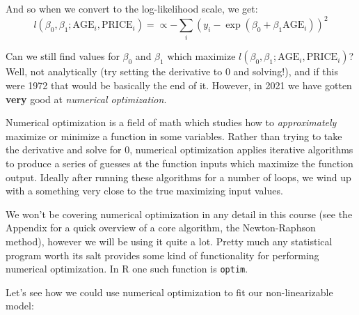 \documentclass[
]{article}
\newenvironment{Shaded}{\begin{snugshade}}{\end{snugshade}}
\newcommand{\AttributeTok}[1]{\textcolor[rgb]{0.77,0.63,0.00}{#1}}
\newcommand{\CommentTok}[1]{\textcolor[rgb]{0.56,0.35,0.01}{\textit{#1}}}
\newcommand{\ControlFlowTok}[1]{\textcolor[rgb]{0.13,0.29,0.53}{\textbf{#1}}}
\newcommand{\DecValTok}[1]{\textcolor[rgb]{0.00,0.00,0.81}{#1}}
\newcommand{\FunctionTok}[1]{\textcolor[rgb]{0.00,0.00,0.00}{#1}}
\newcommand{\NormalTok}[1]{#1}
\newcommand{\OtherTok}[1]{\textcolor[rgb]{0.56,0.35,0.01}{#1}}
\newcommand{\SpecialCharTok}[1]{\textcolor[rgb]{0.00,0.00,0.00}{#1}}
\begin{document}
And so when we convert to the log-likelihood scale, we get: \[
l(\beta_0, \beta_1; \text{AGE}_i, \text{PRICE}_i) = \propto -\sum_i (y_i - \exp{\left(\beta_0 + \beta_1 \text{AGE}_i\right)})^2
\]

Can we still find values for \(\beta_0\) and \(\beta_1\) which maximize
\(l(\beta_0, \beta_1; \text{AGE}_i, \text{PRICE}_i)\)? Well, not
analytically (try setting the derivative to 0 and solving!), and if this
were 1972 that would be basically the end of it. However, in 2021 we
have gotten \textbf{very} good at \emph{numerical optimization}.

Numerical optimization is a field of math which studies how to
\emph{approximately} maximize or minimize a function in some variables.
Rather than trying to take the derivative and solve for 0, numerical
optimization applies iterative algorithms to produce a series of guesses
at the function inputs which maximize the function output. Ideally after
running these algorithms for a number of loops, we wind up with a
something very close to the true maximizing input values.

We won't be covering numerical optimization in any detail in this course
(see the Appendix for a quick overview of a core algorithm, the
Newton-Raphson method), however we will be using it quite a lot. Pretty
much any statistical program worth its salt provides some kind of
functionality for performing numerical optimization. In R one such
function is \texttt{optim}.

Let's see how we could use numerical optimization to fit our
non-linearizable model:

\begin{Shaded}
\end{Shaded}
\end{document}
